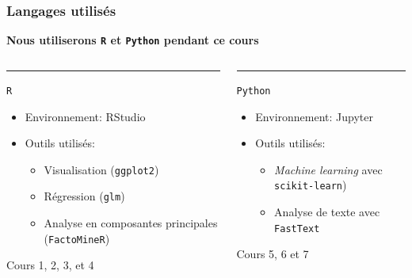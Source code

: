 \documentclass[10pt]{beamer}
\begin{document}
\frame
{ \frametitle{Langages utilisés}

\textbf{Nous utiliserons \texttt{R} et \texttt{Python} pendant ce cours}

\vspace{0.2cm}

    \begin{columns}[T] %
    \begin{column}{.48\textwidth}
    \color{cyan}\rule{\linewidth}{2pt}
    
    \texttt{R}
    \vspace{0.5cm}
    \begin{itemize}
        \item Environnement: RStudio
        \vspace{0.2cm}
        \item Outils utilisés:
        \begin{itemize}
            \item Visualisation (\texttt{ggplot2})
            \item Régression (\texttt{glm})
            \item Analyse en composantes principales (\texttt{FactoMineR})
        \end{itemize}
      \end{itemize}
      \vspace{0.5cm}
       Cours 1, 2, 3, et 4
    \end{column}%
    \hfill%
    \begin{column}{.48\textwidth}
    \color{orange}\rule{\linewidth}{2pt}
    
    \texttt{Python}
    \vspace{0.5cm}
    \begin{itemize}
        \item Environnement: Jupyter
        \vspace{0.2cm}
        
        \item Outils utilisés:
        \begin{itemize}
            \item \textit{Machine learning} avec \texttt{scikit-learn})
            \item Analyse de texte avec \texttt{FastText}
        \end{itemize}
    \end{itemize}
    \vspace{0.5cm}
    Cours 5, 6 et 7
    \end{column}%
    \end{columns}

}
\end{document}
